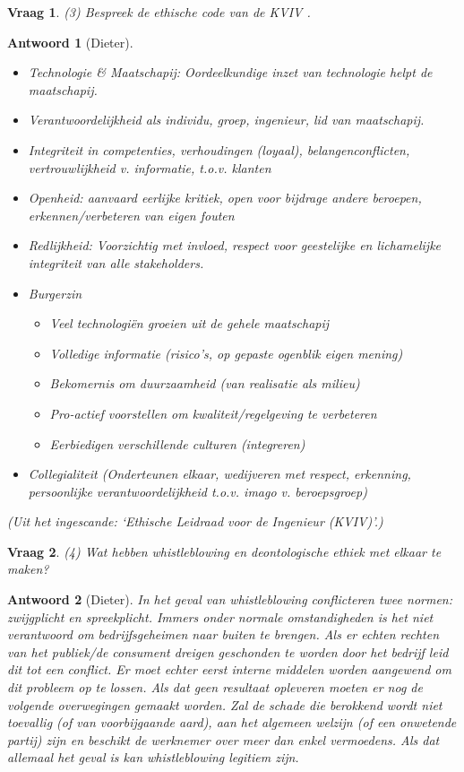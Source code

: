 \documentclass{article}
\theoremstyle{nonumberplain}
\newtheorem{question}{Vraag}
\newtheorem{answer}{Antwoord}
\begin{document}
\begin{question}
(3)	Bespreek de ethische code van de KVIV .
\end{question}
\begin{answer}[Dieter]
	\begin{itemize}
		\item Technologie \& Maatschapij: Oordeelkundige inzet van technologie helpt de maatschapij.
		\item Verantwoordelijkheid als individu, groep, ingenieur, lid van maatschapij. 
		\item Integriteit in competenties, verhoudingen (loyaal), belangenconflicten, vertrouwlijkheid v. informatie, t.o.v. klanten
		\item Openheid: aanvaard eerlijke kritiek, open voor bijdrage andere beroepen, erkennen/verbeteren van eigen fouten
		\item Redlijkheid: Voorzichtig met invloed, respect voor geestelijke en lichamelijke integriteit van alle stakeholders.
		\item Burgerzin 
			\begin{itemize}
				\item Veel technologi\"en groeien uit de gehele maatschapij
				\item Volledige informatie (risico's, op gepaste ogenblik eigen mening)
				\item Bekomernis om duurzaamheid (van realisatie als milieu)
				\item Pro-actief voorstellen om kwaliteit/regelgeving te verbeteren
				\item Eerbiedigen verschillende culturen (integreren)
			\end{itemize} 
		\item Collegialiteit (Onderteunen elkaar, wedijveren met respect, erkenning, persoonlijke verantwoordelijkheid t.o.v. imago v. beroepsgroep)
	\end{itemize}

	\textit{(Uit het ingescande: `Ethische Leidraad voor de Ingenieur (KVIV)'.)}
\end{answer}

\begin{question}
(4)	Wat hebben whistleblowing en deontologische ethiek met elkaar te maken?
\end{question}
\begin{answer}[Dieter]
	In het geval van whistleblowing conflicteren twee normen: zwijgplicht en spreekplicht.
	Immers onder normale omstandigheden is het niet verantwoord om bedrijfsgeheimen naar buiten te brengen.
	Als er echten rechten van het publiek/de consument dreigen geschonden te worden door het bedrijf leid dit tot een conflict.
	Er moet echter eerst interne middelen worden aangewend om dit probleem op te lossen. Als dat geen resultaat opleveren moeten er nog de volgende overwegingen gemaakt worden. Zal de schade die berokkend wordt niet toevallig (of van voorbijgaande aard), aan het algemeen welzijn (of een onwetende partij) zijn en beschikt de werknemer over meer dan enkel vermoedens. Als dat allemaal het geval is kan whistleblowing legitiem zijn.
\end{answer}
\end{document}
